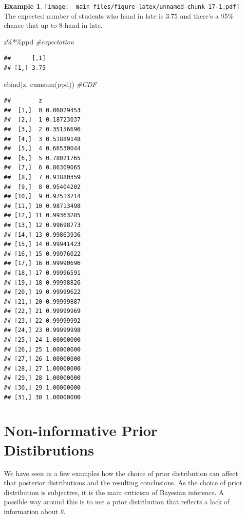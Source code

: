 \documentclass[
]{book}
\newenvironment{Shaded}{\begin{snugshade}}{\end{snugshade}}
\newcommand{\CommentTok}[1]{\textcolor[rgb]{0.56,0.35,0.01}{\textit{#1}}}
\newcommand{\FunctionTok}[1]{\textcolor[rgb]{0.00,0.00,0.00}{#1}}
\newcommand{\NormalTok}[1]{#1}
\newcommand{\SpecialCharTok}[1]{\textcolor[rgb]{0.00,0.00,0.00}{#1}}
\theoremstyle{definition}
\theoremstyle{definition}
\newtheorem{example}{Example}[chapter]
\theoremstyle{definition}
\theoremstyle{definition}
\theoremstyle{remark}
\begin{document}
\begin{example}
\texttt{[image: \_main\_files/figure-latex/unnamed-chunk-17-1.pdf]}
The expected number of students who hand in late is 3.75 and there's a 95\% chance that up to 8 hand in late.

\begin{Shaded}
\begin{Highlighting}[]
\NormalTok{z}\SpecialCharTok{\%*\%}\NormalTok{ppd }\CommentTok{\#expectation}
\end{Highlighting}
\end{Shaded}

\begin{verbatim}
##      [,1]
## [1,] 3.75
\end{verbatim}

\begin{Shaded}
\begin{Highlighting}[]
\FunctionTok{cbind}\NormalTok{(z, }\FunctionTok{cumsum}\NormalTok{(ppd)) }\CommentTok{\#CDF}
\end{Highlighting}
\end{Shaded}

\begin{verbatim}
##        z           
##  [1,]  0 0.06029453
##  [2,]  1 0.18723037
##  [3,]  2 0.35156696
##  [4,]  3 0.51889148
##  [5,]  4 0.66530044
##  [6,]  5 0.78021765
##  [7,]  6 0.86309065
##  [8,]  7 0.91880359
##  [9,]  8 0.95404202
## [10,]  9 0.97513714
## [11,] 10 0.98713498
## [12,] 11 0.99363285
## [13,] 12 0.99698773
## [14,] 13 0.99863936
## [15,] 14 0.99941423
## [16,] 15 0.99976022
## [17,] 16 0.99990696
## [18,] 17 0.99996591
## [19,] 18 0.99998826
## [20,] 19 0.99999622
## [21,] 20 0.99999887
## [22,] 21 0.99999969
## [23,] 22 0.99999992
## [24,] 23 0.99999998
## [25,] 24 1.00000000
## [26,] 25 1.00000000
## [27,] 26 1.00000000
## [28,] 27 1.00000000
## [29,] 28 1.00000000
## [30,] 29 1.00000000
## [31,] 30 1.00000000
\end{verbatim}

\end{example}

\hypertarget{non-informative-prior-distibrutions}{%
\section{Non-informative Prior Distibrutions}\label{non-informative-prior-distibrutions}}

We have seen in a few examples how the choice of prior distribution can affect that posterior distributions and the resulting conclusions. As the choice of prior distribution is subjective, it is the main criticism of Bayesian inference. A possible way around this is to use a prior distribution that reflects a lack of information about \(\theta\).
\end{document}
